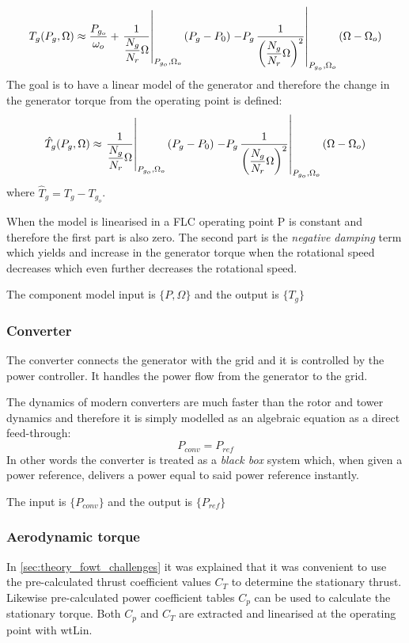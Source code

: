 \begin{equation}
	T_g(P_g, \Omega) \approx \dfrac{P_{g_o}}{\omega_o} + \left. \dfrac{1}{\dfrac{N_g}{N_r} \Omega} \right |_{P_{g_o},\Omega_o} (P_g - P_0) \\ 
	\left. - P_g \, \dfrac{1}{\left( \dfrac{N_g}{N_r} \Omega \right)^2} \right |_{P_{g_o},\Omega_o} (\Omega - \Omega_o)
\end{equation}
The goal is to have a linear model of the generator and therefore the change in the generator torque from the operating point is defined:
\begin{equation}
	\hat T_g(P_g, \Omega) \approx \left. \dfrac{1}{\dfrac{N_g}{N_r} \Omega} \right |_{P_{g_o},\Omega_o} (P_g - P_0) \\ 
	\left. - P_g \, \dfrac{1}{\left( \dfrac{N_g}{N_r} \Omega \right)^2} \right |_{P_{g_o},\Omega_o} (\Omega - \Omega_o)
\end{equation}
where $ \hat T_g = T_g - T_{g_o} $.

When the model is linearised in a FLC operating point P is constant and therefore the first part is also zero. The second part is the \textit{negative damping} term which yields and increase in the generator torque when the rotational speed decreases which even further decreases the rotational speed.

The component model input is $ \{P, \Omega\} $ and the output is $ \{T_g\} $


\subsubsection{Converter} \label{sec:comp_conv_unity}
The converter connects the generator with the grid and it is controlled by the power controller. It handles the power flow from the generator to the grid.

The dynamics of modern converters are much faster than the rotor and tower dynamics and therefore it is simply modelled as an algebraic equation as a direct feed-through:
\begin{equation}\label{eq:comp_convdft}
	P_{conv} = P_{ref}
\end{equation}
In other words the converter is treated as a \textit{black box} system which, when given a power reference, delivers a power equal to said power reference instantly.

The input is $ \{P_{conv}\} $ and the output is $ \{P_{ref}\} $


\subsubsection{Aerodynamic torque} \label{sec:comp_aero_torque}
In \cref{sec:theory_fowt_challenges} it was explained that it was convenient to use the pre-calculated thrust coefficient values $ C_T $ to determine the stationary thrust. Likewise pre-calculated power coefficient tables $ C_p $ can be used to calculate the stationary torque. Both $ C_p $ and $ C_T $ are extracted and linearised at the operating point with wtLin.

